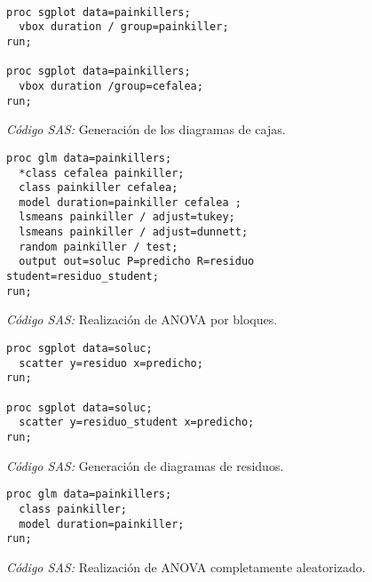 \documentclass[11pt]{article}
\begin{document}
    \begin{figure}[!h]
      \centering
      \begin{verbatim}

proc sgplot data=painkillers;
  vbox duration / group=painkiller;
run;

proc sgplot data=painkillers;
  vbox duration /group=cefalea;
run;
      \end{verbatim}
      \caption{\emph{Código SAS:} Generación de los diagramas de cajas.}
      \label{code:sas_2}
    \end{figure}

    \begin{figure}[!h]
      \centering
      \begin{verbatim}
proc glm data=painkillers;
  *class cefalea painkiller;
  class painkiller cefalea;
  model duration=painkiller cefalea ;
  lsmeans painkiller / adjust=tukey;
  lsmeans painkiller / adjust=dunnett;
  random painkiller / test;
  output out=soluc P=predicho R=residuo student=residuo_student;
run;
      \end{verbatim}
      \caption{\emph{Código SAS:} Realización de ANOVA por bloques.}
      \label{code:sas_3}
    \end{figure}

    \begin{figure}[!h]
      \centering
      \begin{verbatim}
proc sgplot data=soluc;
  scatter y=residuo x=predicho;
run;

proc sgplot data=soluc;
  scatter y=residuo_student x=predicho;
run;
      \end{verbatim}
      \caption{\emph{Código SAS:} Generación de diagramas de residuos.}
      \label{code:sas_4}
    \end{figure}
    \begin{figure}[!h]
      \centering
      \begin{verbatim}
proc glm data=painkillers;
  class painkiller;
  model duration=painkiller;
run;
      \end{verbatim}
      \caption{\emph{Código SAS:} Realización de ANOVA completamente aleatorizado.}
      \label{code:sas_5}
    \end{figure}

  \nocite{rano2017}
  \nocite{sas}

  
  
\end{document}
